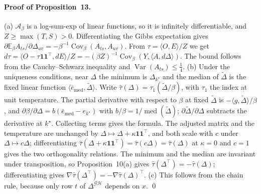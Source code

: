 \paragraph{Proof of Proposition~13.}
(a) $\mathcal A_\beta$ is a log-sum-exp of linear functions, so it is infinitely differentiable, and $Z\ge\max(T,S)>0$. Differentiating the Gibbs expectation gives $\partial\mathbb E_\beta A_{ts}/\partial\Delta_{uv}=-\beta^{-1}\operatorname{Cov}_\beta(A_{ts},A_{uv})$. From $\tau=\langle O,E\rangle/Z$ we get $d\tau=\langle O-\tau\mathbf 1\mathbf 1^\top,dE\rangle/Z=-(\beta Z)^{-1}\operatorname{Cov}_\beta(Y,\langle A,d\Delta\rangle)$. The bound follows from the Cauchy--Schwarz inequality and $\operatorname{Var}(A_{ts})\le\frac14$.
(b) Under the uniqueness conditions, near $\Delta$ the minimum is $\Delta_{k^\star}$ and the median of $\tilde\Delta$ is the fixed linear function $\langle\bar e_{\mathrm{med}},\tilde\Delta\rangle$. Write $\hat\tau(\Delta)=\tau_1(\tilde\Delta/\beta)$, with $\tau_1$ the index at unit temperature. The partial derivative with respect to $\beta$ at fixed $\tilde\Delta$ is $-\langle g,\tilde\Delta\rangle/\beta$, and $\partial\beta/\partial\Delta=b(\bar e_{\mathrm{med}}-e_{k^\star})$ with $b/\beta=1/\operatorname{med}(\tilde\Delta)$; $\partial\tilde\Delta/\partial\Delta$ subtracts the derivative at $k^\star$. Collecting terms gives the formula. The adjusted matrix and the temperature are unchanged by $\Delta\mapsto\Delta+\kappa\mathbf 1\mathbf 1^\top$, and both scale with $c$ under $\Delta\mapsto c\Delta$; differentiating $\hat\tau(\Delta+\kappa\mathbf 1\mathbf 1^\top)=\hat\tau(c\Delta)=\hat\tau(\Delta)$ at $\kappa=0$ and $c=1$ gives the two orthogonality relations. The minimum and the median are invariant under transposition, so Proposition~10(a) gives $\hat\tau(\Delta^\top)=-\hat\tau(\Delta)$; differentiating gives $\nabla\hat\tau(\Delta^\top)=-\nabla\hat\tau(\Delta)^\top$.
(c) This follows from the chain rule, because only row $t$ of $\Delta^{\mathcal{GH}}$ depends on $x$. \qed

